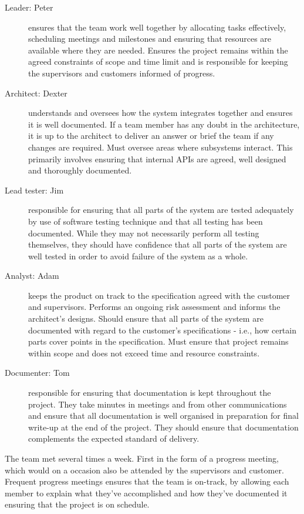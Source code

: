 \begin{description}
\item[Leader: Peter] ensures that the team work well together by allocating tasks effectively, scheduling meetings and milestones and ensuring that resources are available where they are needed. Ensures the project remains within the agreed constraints of scope and time limit and is responsible for keeping the supervisors and customers informed of progress.
\item[Architect: Dexter] understands and oversees how the system integrates together and ensures it is well documented. If a team member has any doubt in the architecture, it is up to the architect to deliver an answer or brief the team if any changes are required. Must oversee areas where subsystems interact. This primarily involves ensuring that internal APIs are agreed, well designed and thoroughly documented.
\item[Lead tester: Jim] responsible for ensuring that all parts of the system are tested adequately by use of software testing technique and that all testing has been documented. While they may not necessarily perform all testing themselves, they should have confidence that all parts of the system are well tested in order to avoid failure of the system as a whole.
\item[Analyst: Adam] keeps the product on track to the specification agreed with the customer and supervisors. Performs an ongoing risk assessment and informs the architect's designs. Should ensure that all parts of the system are documented with regard to the customer's specifications - i.e., how certain parts cover points in the specification. Must ensure that project remains within scope and does not exceed time and resource constraints.
\item[Documenter: Tom] responsible for ensuring that documentation is kept throughout the project. They take minutes in meetings and from other communications and ensure that all documentation is well organised in preparation for final write-up at the end of the project. They should ensure that documentation complements the expected standard of delivery.
\end{description}

The team met several times a week. First in the form of a progress meeting, which would on a occasion also be attended by the supervisors and customer. Frequent progress meetings ensures that the team is on-track, by allowing each member to explain what they've accomplished and how they've documented it ensuring that the project is on schedule.
 
